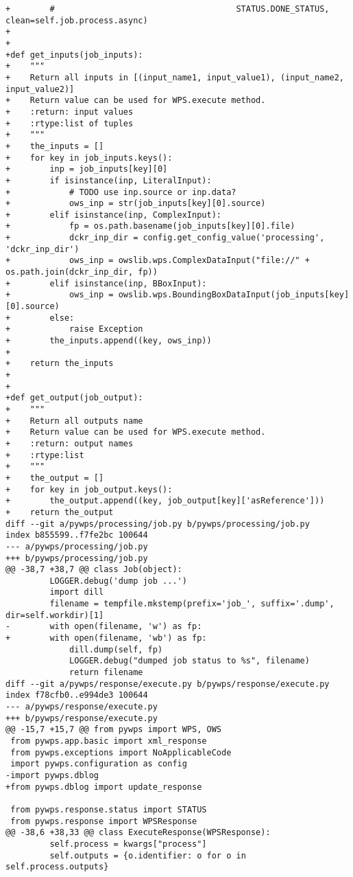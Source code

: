 \begin{lstlisting}[basicstyle=\small,caption={pywps diff file}]
+        #                                     STATUS.DONE_STATUS, clean=self.job.process.async)
+
+
+def get_inputs(job_inputs):
+    """
+    Return all inputs in [(input_name1, input_value1), (input_name2, input_value2)]
+    Return value can be used for WPS.execute method.
+    :return: input values
+    :rtype:list of tuples
+    """
+    the_inputs = []
+    for key in job_inputs.keys():
+        inp = job_inputs[key][0]
+        if isinstance(inp, LiteralInput):
+            # TODO use inp.source or inp.data?
+            ows_inp = str(job_inputs[key][0].source)
+        elif isinstance(inp, ComplexInput):
+            fp = os.path.basename(job_inputs[key][0].file)
+            dckr_inp_dir = config.get_config_value('processing', 'dckr_inp_dir')
+            ows_inp = owslib.wps.ComplexDataInput("file://" + os.path.join(dckr_inp_dir, fp))
+        elif isinstance(inp, BBoxInput):
+            ows_inp = owslib.wps.BoundingBoxDataInput(job_inputs[key][0].source)
+        else:
+            raise Exception
+        the_inputs.append((key, ows_inp))
+
+    return the_inputs
+
+
+def get_output(job_output):
+    """
+    Return all outputs name
+    Return value can be used for WPS.execute method.
+    :return: output names
+    :rtype:list
+    """
+    the_output = []
+    for key in job_output.keys():
+        the_output.append((key, job_output[key]['asReference']))
+    return the_output
diff --git a/pywps/processing/job.py b/pywps/processing/job.py
index b855599..f7fe2bc 100644
--- a/pywps/processing/job.py
+++ b/pywps/processing/job.py
@@ -38,7 +38,7 @@ class Job(object):
         LOGGER.debug('dump job ...')
         import dill
         filename = tempfile.mkstemp(prefix='job_', suffix='.dump', dir=self.workdir)[1]
-        with open(filename, 'w') as fp:
+        with open(filename, 'wb') as fp:
             dill.dump(self, fp)
             LOGGER.debug("dumped job status to %s", filename)
             return filename
diff --git a/pywps/response/execute.py b/pywps/response/execute.py
index f78cfb0..e994de3 100644
--- a/pywps/response/execute.py
+++ b/pywps/response/execute.py
@@ -15,7 +15,7 @@ from pywps import WPS, OWS
 from pywps.app.basic import xml_response
 from pywps.exceptions import NoApplicableCode
 import pywps.configuration as config
-import pywps.dblog
+from pywps.dblog import update_response
 
 from pywps.response.status import STATUS
 from pywps.response import WPSResponse
@@ -38,6 +38,33 @@ class ExecuteResponse(WPSResponse):
         self.process = kwargs["process"]
         self.outputs = {o.identifier: o for o in self.process.outputs}
 

\end{lstlisting}
